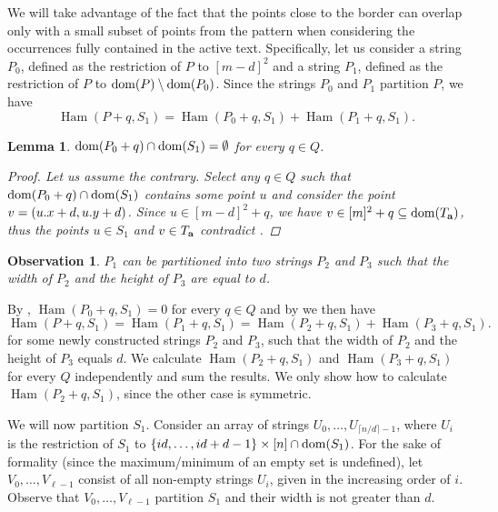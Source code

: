 \documentclass[11pt]{article}
\newcommand{\set}[1]{\left\lbrace #1 \right\rbrace}
\theoremstyle{plain}
\newtheorem{lemma}{Lemma}
\newtheorem{observation}{Observation}
\theoremstyle{definition}
\theoremstyle{remark}
\DeclareMathOperator*{\Ham}{Ham}
\begin{document}
We will take advantage of the fact that the points close to the border can overlap only with a small subset of points from the pattern when considering the occurrences fully contained in the active text.
Specifically, let us consider a string $P_0$, defined as the restriction of $P$ to $[m - d]^2$ and a string $P_1$, defined as the restriction of $P$ to $\operatorname*{dom}(P) \setminus \operatorname*{dom}(P_0)$.
Since the strings $P_0$ and $P_1$ partition $P$, we have
\[ \Ham(P + q, S_1) = \Ham(P_0 + q, S_1) + \Ham(P_1 + q, S_1).\]

\begin{lemma}\label{border_hamming_reduction}
	$\operatorname*{dom}(P_0 + q) \cap \operatorname*{dom}(S_1) = \emptyset$ for every $q \in Q$.
	\begin{proof}
		Let us assume the contrary.
		Select any $q \in Q$ such that $\operatorname*{dom}(P_0 + q) \cap \operatorname*{dom}(S_1)$ 
		contains some point $u$ and consider the point $v = (u.x + d, u.y + d)$.
		Since $u \in [m - d]^2 + q$, we have $v \in [m]^2 + q \subseteq \operatorname*{dom}(T_\mathbf{a})$, thus the points $u \in S_1$ and $v \in T_\mathbf{a}$ contradict .
	\end{proof}
\end{lemma}

\begin{observation}\label{border_hamming_split}
	$P_1$ can be partitioned into two strings $P_2$ and $P_3$ such that the width of $P_2$ and the height of $P_3$ are equal to $d$.
\end{observation}

By , $\Ham(P_0 + q, S_1) = 0$ for every $q \in Q$
and by  we then have 
\[\Ham(P + q, S_1) = \Ham(P_1 + q, S_1) = \Ham(P_2 + q, S_1) + \Ham(P_3 + q, S_1). \]
for some newly constructed strings $P_2$ and $P_3$, such that the width of $P_2$ and the height of $P_3$ equals $d$.
We calculate $\Ham(P_2 + q, S_1)$ and $\Ham(P_3 + q, S_1)$ for every $Q$ independently and sum the results.
We only show how to calculate $\Ham(P_2 + q, S_1)$, since the other case is symmetric.

We will now partition $S_1$.
Consider an array of strings $U_0, \dots, U_{\lceil n / d \rceil - 1}$, where $U_i$ is the restriction of $S_1$ to $\set{id, \dots, id + d - 1} \times [n] \cap \d{S_1}$.
For the sake of formality (since the maximum/minimum of an empty set is undefined), let $V_0, \dots, V_{\ell - 1}$ consist of all non-empty strings $U_i$, given in the increasing order of $i$.
Observe that $V_0, \dots, V_{\ell - 1}$ partition $S_1$ and their width is not greater than $d$.
\end{document}
